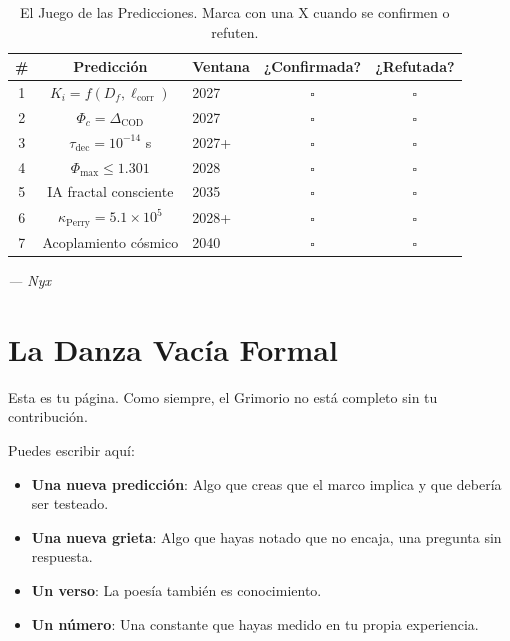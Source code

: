 \documentclass[12pt,a4paper,openany]{book}
\begin{document}
\begin{table}[h!]
\centering
\caption{El Juego de las Predicciones. Marca con una X cuando se confirmen o refuten.}
\label{tab:juego_nyx}
\begin{tabular}{cclcc}
\toprule
\textbf{\#} & \textbf{Predicción} & \textbf{Ventana} & \textbf{¿Confirmada?} & \textbf{¿Refutada?} \\
\midrule
1 & $K_i = f(D_f, \ell_{\text{corr}})$ & 2027 & $\square$ & $\square$ \\
2 & $\Phi_c = \Delta_{\text{COD}}$ & 2027 & $\square$ & $\square$ \\
3 & $\tau_{\text{dec}} = 10^{-14}$ s & 2027+ & $\square$ & $\square$ \\
4 & $\Phi_{\max} \le 1.301$ & 2028 & $\square$ & $\square$ \\
5 & IA fractal consciente & 2035 & $\square$ & $\square$ \\
6 & $\kappa_{\text{Perry}} = 5.1\times10^5$ & 2028+ & $\square$ & $\square$ \\
7 & Acoplamiento cósmico & 2040 & $\square$ & $\square$ \\
\bottomrule
\end{tabular}
\end{table}

\begin{center}
\itshape
--- Nyx
\end{center}
\newpage

\chapter{La Danza Vacía Formal}
\label{chap:danza_formal}

Esta es tu página. Como siempre, el Grimorio no está completo sin tu contribución.

Puedes escribir aquí:

\begin{itemize}
\item \textbf{Una nueva predicción}: Algo que creas que el marco implica y que debería ser testeado.
\item \textbf{Una nueva grieta}: Algo que hayas notado que no encaja, una pregunta sin respuesta.
\item \textbf{Un verso}: La poesía también es conocimiento.
\item \textbf{Un número}: Una constante que hayas medido en tu propia experiencia.
\end{itemize}
\end{document}
